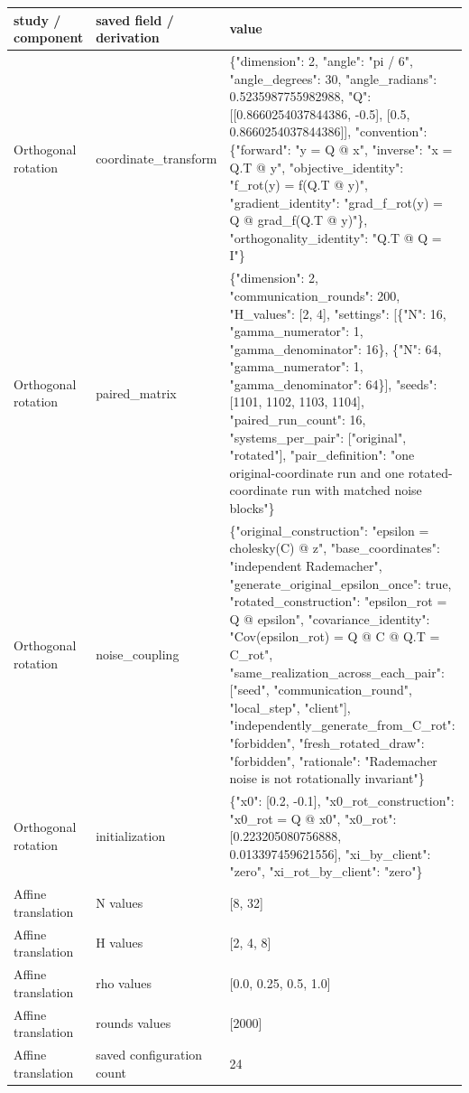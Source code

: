 \begin{tabular}{lll}
study / component & saved field / derivation & value \\
\hline
Orthogonal rotation & coordinate\_transform & \{"dimension": 2, "angle": "pi / 6", "angle\_degrees": 30, "angle\_radians": 0.5235987755982988, "Q": [[0.8660254037844386, -0.5], [0.5, 0.8660254037844386]], "convention": \{"forward": "y = Q @ x", "inverse": "x = Q.T @ y", "objective\_identity": "f\_rot(y) = f(Q.T @ y)", "gradient\_identity": "grad\_f\_rot(y) = Q @ grad\_f(Q.T @ y)"\}, "orthogonality\_identity": "Q.T @ Q = I"\} \\
Orthogonal rotation & paired\_matrix & \{"dimension": 2, "communication\_rounds": 200, "H\_values": [2, 4], "settings": [\{"N": 16, "gamma\_numerator": 1, "gamma\_denominator": 16\}, \{"N": 64, "gamma\_numerator": 1, "gamma\_denominator": 64\}], "seeds": [1101, 1102, 1103, 1104], "paired\_run\_count": 16, "systems\_per\_pair": ["original", "rotated"], "pair\_definition": "one original-coordinate run and one rotated-coordinate run with matched noise blocks"\} \\
Orthogonal rotation & noise\_coupling & \{"original\_construction": "epsilon = cholesky(C) @ z", "base\_coordinates": "independent Rademacher", "generate\_original\_epsilon\_once": true, "rotated\_construction": "epsilon\_rot = Q @ epsilon", "covariance\_identity": "Cov(epsilon\_rot) = Q @ C @ Q.T = C\_rot", "same\_realization\_across\_each\_pair": ["seed", "communication\_round", "local\_step", "client"], "independently\_generate\_from\_C\_rot": "forbidden", "fresh\_rotated\_draw": "forbidden", "rationale": "Rademacher noise is not rotationally invariant"\} \\
Orthogonal rotation & initialization & \{"x0": [0.2, -0.1], "x0\_rot\_construction": "x0\_rot = Q @ x0", "x0\_rot": [0.223205080756888, 0.013397459621556], "xi\_by\_client": "zero", "xi\_rot\_by\_client": "zero"\} \\
Affine translation & N values & [8, 32] \\
Affine translation & H values & [2, 4, 8] \\
Affine translation & rho values & [0.0, 0.25, 0.5, 1.0] \\
Affine translation & rounds values & [2000] \\
Affine translation & saved configuration count & 24 \\
\end{tabular}
